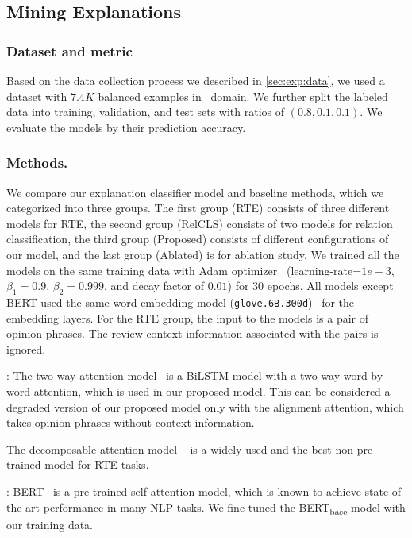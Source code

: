 \subsection{Mining Explanations}\label{subsec:eval_explanation}
\subsubsection{Dataset and metric} Based on the data collection process we described in \ref{sec:exp:data}, we used a dataset with $7.4K$ balanced examples in \hotel\ domain. We further split the labeled data into training, validation, and test sets with ratios of $(0.8, 0.1, 0.1)$. We evaluate the models by their prediction accuracy.

\subsubsection{Methods.}
We compare our explanation classifier model and baseline methods, which we categorized into three groups.
The first group ({\sc RTE}) consists of three different models for RTE, the second group ({\sc RelCLS}) consists of two models for relation classification, the third group ({\sc Proposed}) consists of different configurations of our model, and the last group ({\sc Ablated}) is for ablation study. We trained all the models on the same training data with Adam optimizer~\cite{kingma2014adam} (learning-rate=$1e-3$, $\beta_1=0.9$, $\beta_2=0.999$, and decay factor of $0.01$) for $30$ epochs. All models except BERT used the same word embedding model ({\tt glove.6B.300d})~\cite{pennington-etal-2014-glove} for the embedding layers.
For the {\sc RTE} group, the input to the models is a pair of opinion phrases. The review context information associated with the pairs is ignored.

: The two-way attention model~\cite{rocktaschel2015reasoning} is a BiLSTM model with a two-way word-by-word attention, which is used in our proposed model. This can be considered a degraded version of our proposed model only with the alignment attention, which takes opinion phrases without context information.


 The decomposable attention model ~\cite{parikh-etal-2016-decomposable} is a widely used and the best non-pre-trained model for RTE tasks.

: BERT~\cite{devlin2018bert} is a pre-trained self-attention model, which is known to achieve state-of-the-art performance in many NLP tasks. We fine-tuned the BERT\textsubscript{base} model with our training data.

